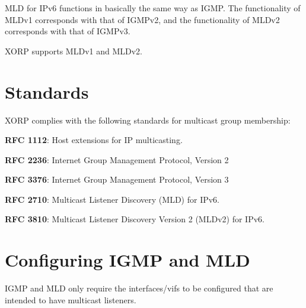 MLD for IPv6 functions in basically the same way as IGMP.  The
functionality of MLDv1 corresponds with that of IGMPv2, and the
functionality of MLDv2 corresponds with that of IGMPv3.  

XORP supports MLDv1 and MLDv2.

\vfill\eject
\section{Standards}
XORP complies with the following standards for multicast group membership:

\begin{description}
  \item{\bf RFC 1112}: Host extensions for IP multicasting.
  \item{\bf RFC 2236}: Internet Group Management Protocol, Version 2
  \item{\bf RFC 3376}: Internet Group Management Protocol, Version 3
  \item{\bf RFC 2710}: Multicast Listener Discovery (MLD) for IPv6.
  \item{\bf RFC 3810}: Multicast Listener Discovery Version 2 (MLDv2) for IPv6.
\end{description}

\section{Configuring IGMP and MLD}

IGMP and MLD only require the interfaces/vifs to be configured that
are intended to have multicast listeners.

